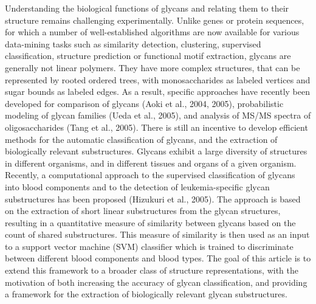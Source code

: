 \documentclass[12pt,a4paper]{article}
\begin{document}
Understanding the biological functions of glycans and relating them to their structure remains challenging experimentally. Unlike genes or protein sequences, for which a number of well-established algorithms are now available for various data-mining tasks such as similarity detection, clustering, supervised classification, structure prediction or functional motif extraction, glycans are generally not linear polymers. They have more complex structures, that can be represented by rooted ordered trees, with monosaccharides as labeled vertices and sugar bounds as labeled edges. As a result, specific approaches have recently been developed for comparison of glycans (Aoki et al., 2004, 2005), probabilistic modeling of glycan families (Ueda et al., 2005), and analysis of MS/MS spectra of oligosaccharides (Tang et al., 2005). There is still an incentive to develop efficient methods for the automatic classification of glycans, and the extraction of biologically relevant substructures. Glycans exhibit a large diversity of structures in different organisms, and in different tissues and organs of a given organism. Recently, a computational approach to the supervised classification of glycans into blood components and to the detection of leukemia-specific glycan substructures has been proposed (Hizukuri et al., 2005). The approach is based on the extraction of short linear substructures from the glycan structures, resulting in a quantitative measure of similarity between glycans based on the count of shared substructures. This measure of similarity is then used as an input to a support vector machine (SVM) classifier which is trained to discriminate between different blood components and blood types. The goal of this article is to extend this framework to a broader class of structure representations, with the motivation of both increasing the accuracy of glycan classification, and providing a framework for the extraction of biologically relevant glycan substructures.
\end{document}
